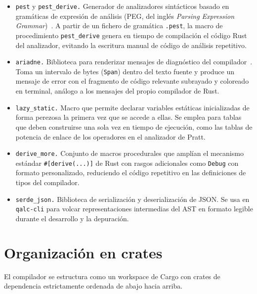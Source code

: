 \begin{itemize}
  \item \texttt{pest} y \texttt{pest\_derive.} Generador de analizadores sintácticos basado en gramáticas de expresión de análisis (PEG, del inglés \textit{Parsing Expression Grammar})~\cite{pest_parser}. A partir de un fichero de gramática \lstinline|.pest|, la macro de procedimiento \lstinline{pest_derive} genera en tiempo de compilación el código Rust del analizador, evitando la escritura manual de código de análisis repetitivo.

  \item \texttt{ariadne.} Biblioteca para renderizar mensajes de diagnóstico del compilador~\cite{ariadne}. Toma un intervalo de bytes (\lstinline|Span|) dentro del texto fuente y produce un mensaje de error con el fragmento de código relevante subrayado y coloreado en terminal, análogo a los mensajes del propio compilador de Rust.

  \item \texttt{lazy\_static.} Macro que permite declarar variables estáticas inicializadas de forma perezosa la primera vez que se accede a ellas. Se emplea para tablas que deben construirse una sola vez en tiempo de ejecución, como las tablas de potencia de enlace de los operadores en el analizador de Pratt.

  \item \texttt{derive\_more.} Conjunto de macros procedurales que amplían el mecanismo estándar \lstinline|#[derive(...)]| de Rust con rasgos adicionales como \lstinline|Debug| con formato personalizado, reduciendo el código repetitivo en las definiciones de tipos del compilador.

  \item \texttt{serde\_json.} Biblioteca de serialización y deserialización de JSON. Se usa en \lstinline|qalc-cli| para volcar representaciones intermedias del AST en formato legible durante el desarrollo y la depuración.
\end{itemize}

\section{Organización en crates}
\label{sec:organizacion-crates}

El compilador se estructura como un workspace de Cargo con crates de dependencia estrictamente ordenada de abajo hacia arriba.

